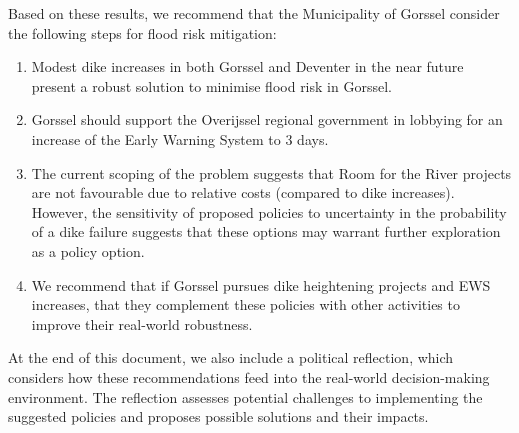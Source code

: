 \begin{multicols}{2}
Based on these results, we recommend that the Municipality of Gorssel consider the following steps for flood risk mitigation:
\begin{enumerate}
    \item Modest dike increases in both Gorssel and Deventer in the near future present a robust solution to minimise flood risk in Gorssel.
    \item Gorssel should support the Overijssel regional government in lobbying for an increase of the Early Warning System to 3 days.
    \item The current scoping of the problem suggests that Room for the River projects are not favourable due to relative costs (compared to dike increases). However, the sensitivity of proposed policies to uncertainty in the probability of a dike failure suggests that these options may warrant further exploration as a policy option.
    \item We recommend that if Gorssel pursues dike heightening projects and EWS increases, that they complement these policies with other activities to improve their real-world robustness.
\end{enumerate}

\noindent At the end of this document, we also include a political reflection, which considers how these recommendations feed into the real-world decision-making environment. The reflection assesses potential challenges to implementing the suggested policies and proposes possible solutions and their impacts.



\end{multicols}